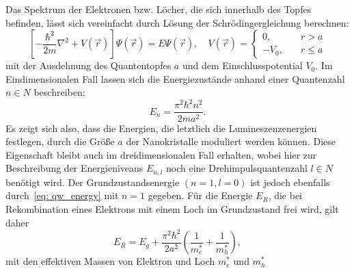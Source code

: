 Das Spektrum der Elektronen bzw. Löcher,
die sich innerhalb des Topfes befinden, lässt sich vereinfacht durch Lösung der Schrödingergleichung berechnen:
\begin{equation}
  \left[-\frac{\hbar^2}{2 m} \nabla^2 + V(\vec{r}) \right] \Psi(\vec{r}) = E \Psi(\vec{r}), \quad
  V(\vec{r}) = \begin{cases}
0,& \quad r > a\\
-V_0,& \quad r \leq a
\end{cases}
\end{equation}
mit der Ausdehnung des Quantentopfes $a$ und dem Einschlusspotential $V_0$.
Im Eindimensionalen Fall lassen sich die Energiezustände
anhand einer Quantenzahl $n \in N$ beschreiben:
\begin{equation}
  E_n = \frac{\pi^2\hbar^2n^2}{ 2 m a^2}.
  \label{eq: qw_energy}
\end{equation}
Es zeigt sich also, dass die Energien, die letztlich die Lumineszenzenergien festlegen, durch die Größe $a$ der Nanokristalle
moduliert werden können. Diese Eigenschaft bleibt auch im dreidimensionalen Fall erhalten, wobei hier zur Beschreibung der
Energieniveaus $E_{n, l}$ noch eine Drehimpulsquantenzahl $l \in N$ benötigt wird. Der Grundzustandsenergie
$(n = 1, l = 0)$ ist jedoch ebenfalls durch~\eqref{eq: qw_energy} mit $n = 1$ gegeben. Für die Energie $E_R$, die bei Rekombination eines
Elektrons mit einem Loch im Grundzustand frei wird, gilt daher
\begin{equation}
  E_R = E_g + \frac{\pi^2\hbar^2}{ 2  a^2} \left(\frac{1}{m_e^*} + \frac{1}{m_h^*}\right),
\end{equation}
mit den effektiven Massen von Elektron und Loch $m_e^*$ und $m_h^*$

